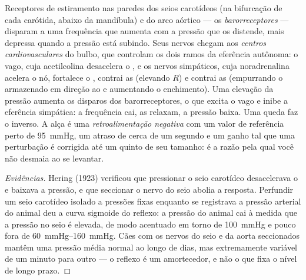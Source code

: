 \begin{definition}[O barorreflexo]\label{def:b2:blood-pressure:baroreflex}
Receptores de estiramento nas paredes dos seios carotídeos (na
bifurcação de cada  carótida, abaixo da mandíbula) e do arco
aórtico --- os \emph{barorreceptores} --- disparam a uma frequência que
aumenta com a pressão que os distende, mais depressa quando a pressão
está subindo. Seus nervos chegam aos \emph{centros cardiovasculares} do
bulbo, que controlam os dois ramos da eferência autônoma: o vago, cuja
acetilcolina desacelera o , e os nervos simpáticos, cuja
noradrenalina acelera o nó, fortalece o , contrai as
 (elevando $R$) e contrai as  (empurrando o 
armazenado em direção ao  e aumentando o enchimento). Uma
elevação da pressão aumenta os disparos dos barorreceptores, o que
excita o vago e inibe a eferência simpática: a frequência cai, as
 relaxam, a pressão baixa. Uma queda faz o inverso. A alça é
uma \emph{retroalimentação negativa} com um valor de referência perto
de \qty{95}{mmHg}, um atraso de cerca de um segundo e um ganho tal que
uma perturbação é corrigida até um quinto de seu tamanho: é a razão
pela qual você não desmaia ao se levantar.
\end{definition}
\begin{proof}[Evidências]
Hering (1923) verificou que pressionar o seio carotídeo desacelerava o
 e baixava a pressão, e que seccionar o nervo do seio abolia a
resposta. Perfundir um seio carotídeo isolado a pressões fixas enquanto
se registrava a pressão arterial do animal deu a curva sigmoide do
reflexo: a pressão do animal cai à medida que a pressão no seio é
elevada, de modo acentuado em torno de \qty{100}{mmHg} e pouco fora de
\qtyrange{60}{160}{mmHg}. Cães com os nervos do seio e da aorta
seccionados mantêm uma pressão média normal ao longo de dias, mas
extremamente variável de um minuto para outro --- o reflexo é um
amortecedor, e não o que fixa o nível de longo prazo.
\end{proof}

